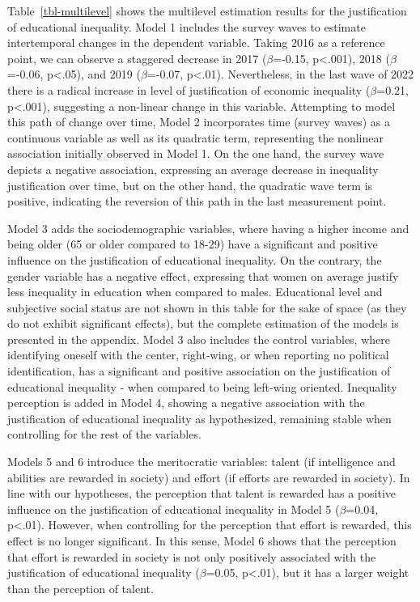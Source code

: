 \documentclass[
]{article}
\begin{document}
Table~\ref{tbl-multilevel} shows the multilevel estimation results for
the justification of educational inequality. Model 1 includes the survey
waves to estimate intertemporal changes in the dependent variable.
Taking 2016 as a reference point, we can observe a staggered decrease in
2017 (\(\beta\)=-0.15, p\textless.001), 2018 (\(\beta\)=-0.06,
p\textless.05), and 2019 (\(\beta\)=-0.07, p\textless.01). Nevertheless,
in the last wave of 2022 there is a radical increase in level of
justification of economic inequality (\(\beta\)=0.21, p\textless.001),
suggesting a non-linear change in this variable. Attempting to model
this path of change over time, Model 2 incorporates time (survey waves)
as a continuous variable as well as its quadratic term, representing the
nonlinear association initially observed in Model 1. On the one hand,
the survey wave depicts a negative association, expressing an average
decrease in inequality justification over time, but on the other hand,
the quadratic wave term is positive, indicating the reversion of this
path in the last measurement point.

Model 3 adds the sociodemographic variables, where having a higher
income and being older (65 or older compared to 18-29) have a
significant and positive influence on the justification of educational
inequality. On the contrary, the gender variable has a negative effect,
expressing that women on average justify less inequality in education
when compared to males. Educational level and subjective social status
are not shown in this table for the sake of space (as they do not
exhibit significant effects), but the complete estimation of the models
is presented in the appendix. Model 3 also includes the control
variables, where identifying oneself with the center, right-wing, or
when reporting no political identification, has a significant and
positive association on the justification of educational inequality -
when compared to being left-wing oriented. Inequality perception is
added in Model 4, showing a negative association with the justification
of educational inequality as hypothesized, remaining stable when
controlling for the rest of the variables.

Models 5 and 6 introduce the meritocratic variables: talent (if
intelligence and abilities are rewarded in society) and effort (if
efforts are rewarded in society). In line with our hypotheses, the
perception that talent is rewarded has a positive influence on the
justification of educational inequality in Model 5 (\(\beta\)=0.04,
p\textless.01). However, when controlling for the perception that effort
is rewarded, this effect is no longer significant. In this sense, Model
6 shows that the perception that effort is rewarded in society is not
only positively associated with the justification of educational
inequality (\(\beta\)=0.05, p\textless.01), but it has a larger weight
than the perception of talent.
\end{document}

